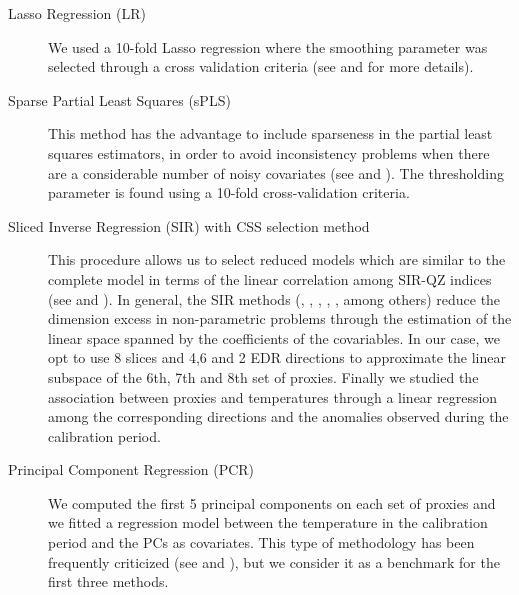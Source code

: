 \documentclass[11pt]{amsart}
\theoremstyle{plain}
\theoremstyle{definition}
\theoremstyle{remark}
\begin{document}
\begin{description}
\item[Lasso Regression (LR)]
We used a 10-fold Lasso regression where the smoothing parameter was selected
through a cross validation criteria (see \cite{Tibshirani1996} and \cite{Friedman2010} for more details). %
  
\item[Sparse Partial Least Squares (sPLS)] 
  This method has the advantage to include sparseness in the partial least squares
  estimators, in order to avoid inconsistency problems when there are a
  considerable number of noisy covariates (see \cite{Chun2010} and \cite{Chung2013}). The
  thresholding parameter is found using a 10-fold cross-validation criteria.    
\item[Sliced Inverse Regression (SIR) with CSS selection method]
  This procedure allows us to select reduced models which are similar to the
  complete model in terms of the linear correlation among SIR-QZ indices (see
  \cite{Coudret2014} and \cite{Coudret2017}). In general, the SIR methods (\cite{Li1991},
  \cite{Duan1991}, \cite{Zhong2005}, \cite{Li2008}, \cite{Coudret2014}, \cite{Weisberg2002} among
  others) reduce the dimension excess in non-parametric problems through the
  estimation of the linear space spanned by the coefficients of the covariables.
  In our case, we opt to use 8 slices and 4,6 and 2 EDR directions to approximate the linear
  subspace of the 6th, 7th and 8th set of proxies. Finally we studied the association between proxies and temperatures
  through a linear regression among the corresponding directions and the anomalies observed
  during the calibration period. 
\item[Principal Component Regression (PCR)]
We computed the first 5 principal components on each set of proxies and we fitted a
regression model between the temperature in the calibration period and the PCs
as covariates. This type of methodology has been frequently criticized (see
\cite{Jolliffe1982} and \cite{Tibshirani1996}),
but we consider it as a benchmark for the first three methods. 
\end{description}
\end{document}
